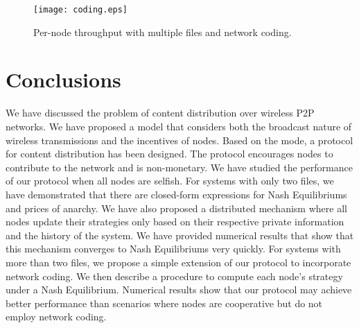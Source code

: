 \documentclass[11pt, conference]{IEEEtran}
\def\baselinestretch{0.83}
\begin{document}
\begin{figure}[t]
\texttt{[image: coding.eps]}
\caption{Per-node throughput with multiple files and network coding.} \label{fig:numerical:coding}
\end{figure}


\section{Conclusions}   \label{section:conclusion}

We have discussed the problem of content distribution over wireless P2P networks. We have proposed a model that considers both the broadcast nature of wireless transmissions and the incentives of nodes. Based on the mode, a protocol for content distribution has been designed. The protocol encourages nodes to contribute to the network and is non-monetary. We have studied the performance of our protocol when all nodes are selfish. For systems with only two files, we have demonstrated that there are closed-form expressions for Nash Equilibriums and prices of anarchy. We have also proposed a distributed mechanism where all nodes update their strategies only based on their respective private information and the history of the system. We have provided numerical results that show that this mechanism converges to Nash Equilibriums very quickly. For systems with more than two files, we propose a simple extension of our protocol to incorporate network coding. We then describe a procedure to compute each node's strategy under a Nash Equilibrium. Numerical results show that our protocol may achieve better performance than scenarios where nodes are cooperative but do not employ network coding.



\def\baselinestretch{0.85}
\small


\end{document}
